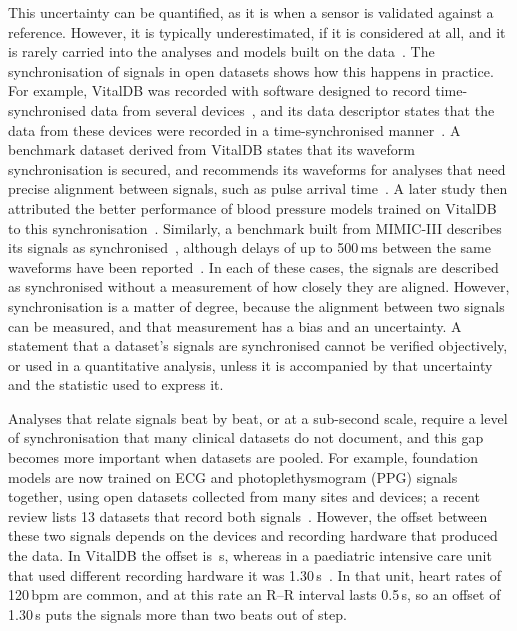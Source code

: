 \documentclass[11pt,a4paper]{article}
\makeatletter
\newcommand{\fact}[1]{\@ifundefined{fact@#1}{\textcolor{red}{??#1}}{\@nameuse{fact@#1}}}
\makeatother
\begin{document}
This uncertainty can be quantified, as it is when a sensor is validated against a reference. However, it is typically
underestimated, if it is considered at all, and it is rarely carried into the analyses and models built on the
data~\citep{ansermino2023measurement}. The synchronisation of signals in open datasets shows how this happens in
practice. For example, VitalDB was recorded with software designed to record time-synchronised data from several
devices~\citep{lee2018vitalrecorder}, and its data descriptor states that the data from these devices were recorded in
a time-synchronised manner~\citep{lee2022vitaldb}. A benchmark dataset derived from VitalDB states that its waveform
synchronisation is secured, and recommends its waveforms for analyses that need precise alignment between signals,
such as pulse arrival time~\citep{wang2023pulsedb}. A later study then attributed the better performance of blood
pressure models trained on VitalDB to this synchronisation~\citep{fritzsche2026role}. Similarly, a benchmark built
from MIMIC-III describes its signals as synchronised~\citep{moulaeifard2026mimic}, although delays of up to 500\,ms
between the same waveforms have been reported~\citep{wang2023pulsedb}. In each of these cases, the signals are
described as synchronised without a measurement of how closely they are aligned. However, synchronisation is a matter
of degree, because the alignment between two signals can be measured, and that measurement has a bias and an
uncertainty. A statement that a dataset's signals are synchronised cannot be verified objectively, or used in a
quantitative analysis, unless it is accompanied by that uncertainty and the statistic used to express it.

Analyses that relate signals beat by beat, or at a sub-second scale, require a level of synchronisation that many
clinical datasets do not document, and this gap becomes more important when datasets are pooled. For example,
foundation models are now trained on ECG and photoplethysmogram (PPG) signals together, using open datasets collected
from many sites and devices; a recent review lists 13 datasets that record both signals~\citep{han2026review}.
However, the offset between these two signals depends on the devices and recording hardware that produced the data.
In VitalDB the offset is \fact{pleth.delay}\,s, whereas in a paediatric intensive care unit that used different
recording hardware it was 1.30\,s~\citep{ruffolo2025high}. In that unit, heart rates of 120\,bpm are common, and at
this rate an R--R interval lasts 0.5\,s, so an offset of 1.30\,s puts the signals more than two beats out of step.
\end{document}
